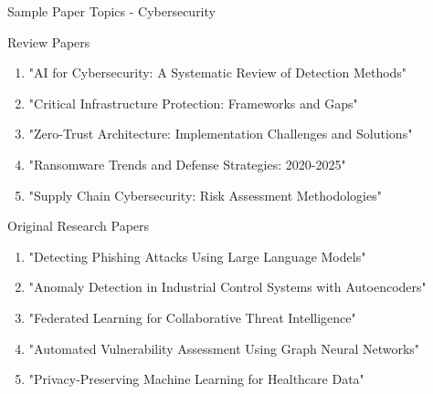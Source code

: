 \documentclass[11pt]{beamer}
\begin{document}
	\begin{frame}{Sample Paper Topics - Cybersecurity}
		\scriptsize
		\begin{block}{Review Papers}
			\begin{enumerate}
				\item "AI for Cybersecurity: A Systematic Review of Detection Methods"
				\item "Critical Infrastructure Protection: Frameworks and Gaps"
				\item "Zero-Trust Architecture: Implementation Challenges and Solutions"
				\item "Ransomware Trends and Defense Strategies: 2020-2025"
				\item "Supply Chain Cybersecurity: Risk Assessment Methodologies"
			\end{enumerate}
		\end{block}
		\begin{block}{Original Research Papers}
			\begin{enumerate}
				\item "Detecting Phishing Attacks Using Large Language Models"
				\item "Anomaly Detection in Industrial Control Systems with Autoencoders"
				\item "Federated Learning for Collaborative Threat Intelligence"
				\item "Automated Vulnerability Assessment Using Graph Neural Networks"
				\item "Privacy-Preserving Machine Learning for Healthcare Data"
			\end{enumerate}
		\end{block}
	\end{frame}
	
\end{document}
